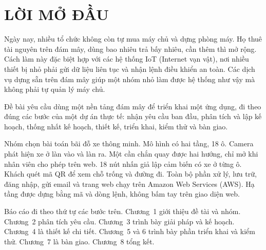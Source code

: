 
\chapter*{LỜI MỞ ĐẦU}

Ngày nay, nhiều tổ chức không còn tự mua máy chủ và dựng phòng máy. Họ thuê tài nguyên trên đám mây, dùng bao nhiêu trả bấy nhiêu, cần thêm thì mở rộng. Cách làm này đặc biệt hợp với các hệ thống IoT (Internet vạn vật), nơi nhiều thiết bị nhỏ phải gửi dữ liệu liên tục và nhận lệnh điều khiển an toàn. Các dịch vụ dựng sẵn trên đám mây giúp một nhóm nhỏ làm được hệ thống như vậy mà không phải tự quản lý máy chủ.

Đề bài yêu cầu dùng một nền tảng đám mây để triển khai một ứng dụng, đi theo đúng các bước của một dự án thực tế: nhận yêu cầu ban đầu, phân tích và lập kế hoạch, thống nhất kế hoạch, thiết kế, triển khai, kiểm thử và bàn giao.

Nhóm chọn bài toán bãi đỗ xe thông minh. Mô hình có hai tầng, 18 ô. Camera phát hiện xe ở làn vào và làn ra. Một cần chắn quay được hai hướng, chỉ mở khi nhân viên cho phép trên web. 18 nút nhấn giả lập cảm biến có xe ở từng ô. Khách quét mã QR để xem chỗ trống và đường đi. Toàn bộ phần xử lý, lưu trữ, đăng nhập, gửi email và trang web chạy trên Amazon Web Services (AWS). Hạ tầng được dựng bằng mã và dòng lệnh, không bấm tay trên giao diện web.

Báo cáo đi theo thứ tự các bước trên. Chương~1 giới thiệu đề tài và nhóm. Chương~2 phân tích yêu cầu. Chương~3 trình bày giải pháp và kế hoạch. Chương~4 là thiết kế chi tiết. Chương~5 và 6 trình bày phần triển khai và kiểm thử. Chương~7 là bàn giao. Chương~8 tổng kết.


\tableofcontents
\listoffigures
\listoftables

